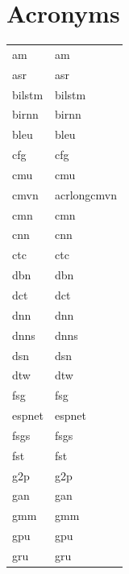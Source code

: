 \documentclass[12pt,twoside]{report}
\begin{document}
\tableofcontents

\listoffigures
 
\listoftables
{}
\listofalgorithms
\newpage
{}
\clearpage

\begin{table}[tp]
\chapter*{Acronyms}
  \label{tab:acronymns}
\begin{tabular}{ll}
\acrshort{am} & \acrlong{am}\\
\acrshort{asr} & \acrlong{asr}\\
\acrshort{bilstm} & \acrlong{bilstm}\\
\acrshort{birnn} & \acrlong{birnn}\\
\acrshort{bleu} & \acrlong{bleu}\\
\acrshort{cfg} & \acrlong{cfg} \\
\acrshort{cmu} & \acrlong{cmu} \\
\acrshort{cmvn} & acrlong{cmvn} \\
\acrshort{cmn} & \acrlong{cmn} \\
\acrshort{cnn} & \acrlong{cnn} \\
\acrshort{ctc} & \acrlong{ctc} \\
\acrshort{dbn} & \acrlong{dbn} \\
\acrshort{dct} & \acrlong{dct} \\
\acrshort{dnn} & \acrlong{dnn} \\
\acrshort{dnns} & \acrlong{dnns} \\
\acrshort{dsn} & \acrlong{dsn} \\
\acrshort{dtw} & \acrlong{dtw} \\
\acrshort{fsg} & \acrlong{fsg} \\
\acrshort{espnet} & \acrlong{espnet} \\
\acrshort{fsgs} & \acrlong{fsgs} \\
\acrshort{fst} & \acrlong{fst} \\
\acrshort{g2p} & \acrlong{g2p} \\
\acrshort{gan} & \acrlong{gan} \\
\acrshort{gmm} & \acrlong{gmm} \\
\acrshort{gpu} & \acrlong{gpu} \\
\acrshort{gru} & \acrlong{gru} \\

\end{tabular}
\end{table}
\end{document}
